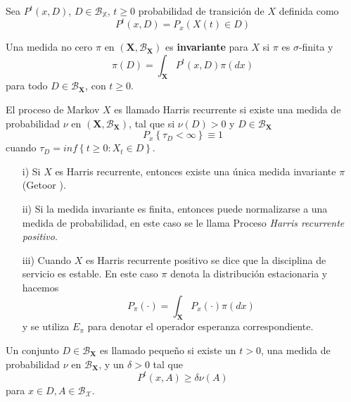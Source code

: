 Sea $P^{t}\left(x,D\right)$, $D\in\mathcal{B}_{\mathbb{X}}$,
$t\geq0$ probabilidad de transici\'on de $X$ definida como
\[P^{t}\left(x,D\right)=P_{x}\left(X\left(t\right)\in
D\right)\]


\begin{Def}
Una medida no cero $\pi$ en
$\left(\mathbf{X},\mathcal{B}_{\mathbf{X}}\right)$ es {\bf
invariante} para $X$ si $\pi$ es $\sigma$-finita y
\[\pi\left(D\right)=\int_{\mathbf{X}}P^{t}\left(x,D\right)\pi\left(dx\right)\]
para todo $D\in \mathcal{B}_{\mathbf{X}}$, con $t\geq0$.
\end{Def}

\begin{Def}
El proceso de Markov $X$ es llamado Harris recurrente si existe
una medida de probabilidad $\nu$ en
$\left(\mathbf{X},\mathcal{B}_{\mathbf{X}}\right)$, tal que si
$\nu\left(D\right)>0$ y $D\in\mathcal{B}_{\mathbf{X}}$
\[P_{x}\left\{\tau_{D}<\infty\right\}\equiv1\] cuando
$\tau_{D}=inf\left\{t\geq0:X_{t}\in D\right\}$.
\end{Def}

\begin{Note}
\begin{itemize}
\item[i)] Si $X$ es Harris recurrente, entonces existe una \'unica
medida invariante $\pi$ (Getoor \cite{Getoor}).

\item[ii)] Si la medida invariante es finita, entonces puede
normalizarse a una medida de probabilidad, en este caso se le
llama Proceso {\em Harris recurrente positivo}.


\item[iii)] Cuando $X$ es Harris recurrente positivo se dice que
la disciplina de servicio es estable. En este caso $\pi$ denota la
distribuci\'on estacionaria y hacemos
\[P_{\pi}\left(\cdot\right)=\int_{\mathbf{X}}P_{x}\left(\cdot\right)\pi\left(dx\right)\]
y se utiliza $E_{\pi}$ para denotar el operador esperanza
correspondiente.
\end{itemize}
\end{Note}

\begin{Def}\label{Def.Cto.Peq.}
Un conjunto $D\in\mathcal{B_{\mathbf{X}}}$ es llamado peque\~no si
existe un $t>0$, una medida de probabilidad $\nu$ en
$\mathcal{B_{\mathbf{X}}}$, y un $\delta>0$ tal que
\[P^{t}\left(x,A\right)\geq\delta\nu\left(A\right)\] para $x\in
D,A\in\mathcal{B_{X}}$.
\end{Def}

